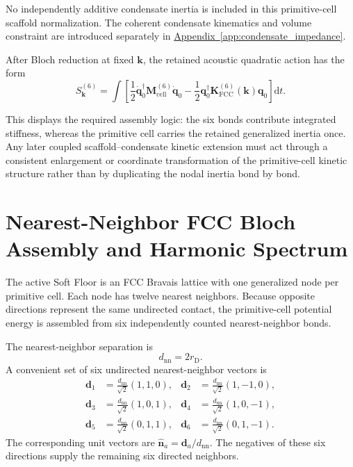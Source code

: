 No independently additive condensate inertia is included in this primitive-cell scaffold normalization. The coherent condensate kinematics and volume constraint are introduced separately in \hyperref[app:condensate_impedance]{Appendix~\ref*{app:condensate_impedance}}.

After Bloch reduction at fixed $\mathbf{k}$, the retained acoustic quadratic action has the form
\begin{equation}
    S_{\mathbf{k}}^{(6)} = \int \left[ \frac{1}{2} \dot{\mathbf{q}}_0^{\dagger} \mathbf{M}_{\mathrm{cell}}^{(6)} \dot{\mathbf{q}}_0 - \frac{1}{2} \mathbf{q}_0^{\dagger} \mathbf{K}_{\mathrm{FCC}}^{(6)}(\mathbf{k}) \mathbf{q}_0 \right] \mathrm{d}t.
\end{equation}

This displays the required assembly logic: the six bonds contribute integrated stiffness, whereas the primitive cell carries the retained generalized inertia once. Any later coupled scaffold--condensate kinetic extension must act through a consistent enlargement or coordinate transformation of the primitive-cell kinetic structure rather than by duplicating the nodal inertia bond by bond.


\section{Nearest-Neighbor FCC Bloch Assembly and Harmonic Spectrum}
\label{sec:fcc_bloch_assembly}

The active Soft Floor is an FCC Bravais lattice with one generalized node per primitive cell. Each node has twelve nearest neighbors. Because opposite directions represent the same undirected contact, the primitive-cell potential energy is assembled from six independently counted nearest-neighbor bonds.

The nearest-neighbor separation is
\begin{equation}
    d_{\mathrm{nn}}=2r_{\mathrm{D}}.
\end{equation}
A convenient set of six undirected nearest-neighbor vectors is
\begin{equation}
\begin{aligned}
    \mathbf{d}_1&=\frac{d_{\mathrm{nn}}}{\sqrt{2}}(1,1,0), & \mathbf{d}_2&=\frac{d_{\mathrm{nn}}}{\sqrt{2}}(1,-1,0),\\
    \mathbf{d}_3&=\frac{d_{\mathrm{nn}}}{\sqrt{2}}(1,0,1), & \mathbf{d}_4&=\frac{d_{\mathrm{nn}}}{\sqrt{2}}(1,0,-1),\\
    \mathbf{d}_5&=\frac{d_{\mathrm{nn}}}{\sqrt{2}}(0,1,1), & \mathbf{d}_6&=\frac{d_{\mathrm{nn}}}{\sqrt{2}}(0,1,-1).
\end{aligned}
\end{equation}
The corresponding unit vectors are $\hat{\mathbf{n}}_a=\mathbf{d}_a/d_{\mathrm{nn}}$. The negatives of these six directions supply the remaining six directed neighbors.

